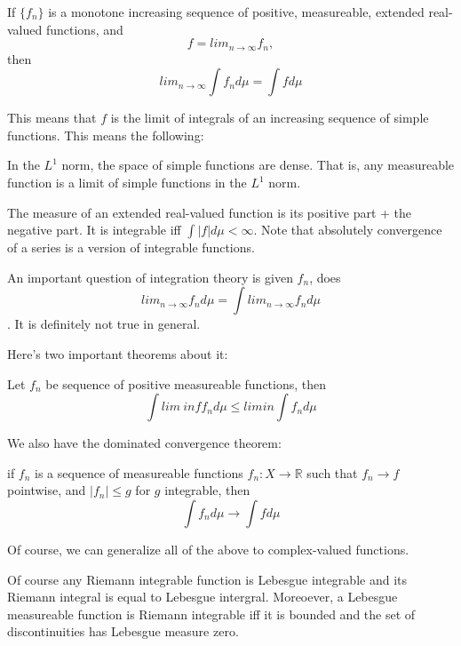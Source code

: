 \documentclass[main.tex]{subfiles}
\begin{document}
\begin{theorem}
If $\{f_n\}$ is a monotone increasing sequence of positive, measureable, extended real-valued functions, and 
$$
f = lim_{n\rightarrow \infty} f_n,
$$
then 
$$
lim_{n \rightarrow \infty} \int f_n d\mu = \int f d\mu
$$
\end{theorem}

This means that $f$ is the limit of integrals of an increasing sequence of simple functions. This means the following:

\begin{lemma}
In the $L^1$ norm, the space of simple functions are dense. That is, any measureable function is a limit of simple functions in the $L^1$ norm.
\end{lemma}

The measure of an extended real-valued function is its positive part  + the negative part.
It is integrable iff $\int |f| d\mu < \infty$. Note that absolutely convergence of a series is a version of integrable functions.

An important question of integration theory is given $f_n$, does $$
lim_{n \rightarrow \infty} f_n d \mu = \int lim_{n \rightarrow \infty} f_n d \mu
$$.
It is definitely not true in general. 

Here's two important theorems about it:

\begin{theorem}
Let $f_n$ be sequence of positive measureable functions, then 
$$
\int lim\ inf f_n d\mu \leq lim in \int f_n d\mu
$$
\end{theorem}


We also have the dominated convergence theorem:
\begin{theorem}
if $f_n$ is a sequence of measureable functions $f_n: X \rightarrow \mathbb{R}$ such that $f_n \rightarrow f$ pointwise, and $|f_n| \leq g$ for $g$ integrable, then
$$
\int f_n d\mu \rightarrow \int f d\mu 
$$
\end{theorem}

Of course, we can generalize all of the above to complex-valued functions.

\begin{theorem}
Of course any Riemann integrable function is Lebesgue integrable and its Riemann integral is equal to Lebesgue intergral. Moreoever, a Lebesgue measureable function is Riemann integrable iff it is bounded and the set of discontinuities has Lebesgue measure zero.
\end{theorem}
\end{document}
